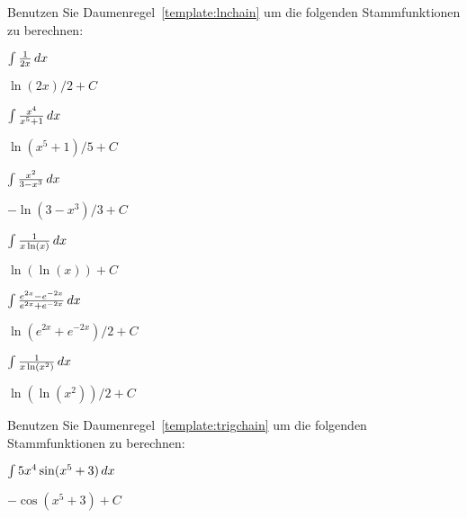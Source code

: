 \begin{exercises}
\noindent Benutzen Sie Daumenregel~\ref{template:lnchain} um die folgenden Stammfunktionen zu berechnen:

\begin{multicols}{2}
\begin{exercise}
$\int \frac{1}{2x} \, d x$
\begin{answer}
$\ln(2x)/2 + C$
\end{answer}
\end{exercise}

\begin{exercise}
$\int \frac{x^4}{x^5+1} \, d x$
\begin{answer}
$\ln(x^5+1)/5 +C$
\end{answer}
\end{exercise}

\begin{exercise}
$\int \frac{x^2}{3-x^3} \, d x$  
\begin{answer}
$-\ln(3-x^3)/3+C$
\end{answer}
\end{exercise}

\columnbreak

\begin{exercise}
$\int \frac{1}{x\ln(x)} \, d x$ 
\begin{answer}
$\ln(\ln(x))+C$
\end{answer}
\end{exercise}

\begin{exercise}
$\int \frac{e^{2x}-e^{-2x}}{e^{2x}+e^{-2x}} \, d x$ 
\begin{answer}
$\ln(e^{2x}+e^{-2x})/2 +C$
\end{answer}
\end{exercise}
\end{multicols}

\begin{exercise}
$\int \frac{1}{x\ln(x^2)} \, d x$ 
\begin{answer}
$\ln(\ln(x^2))/2 + C$
\end{answer}
\end{exercise}


\noindent Benutzen Sie Daumenregel~\ref{template:trigchain} um die folgenden Stammfunktionen zu berechnen:


\begin{multicols}{2}
\begin{exercise}
$\int 5x^4 \sin(x^5+3) \, d x$ 
\begin{answer}
$-\cos(x^5+3) +C$
\end{answer}
\end{exercise}


\end{multicols}
\end{exercises}
